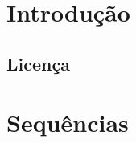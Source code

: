 \documentclass[tcc2]{uftex}
\begin{document}
\chapter{Introdução}
\label{sec:introducao}
\noindent 
\lipsum[1]

\lipsum[2]

\lipsum[3]

\section{Licença}
\label{sec:Licenca}

\noindent 
\lipsum[4]

\lipsum[5]

\lipsum[6]

\backmatter 
\singlespacing   


\appendix
\onehalfspacing

\chapter{Sequências}
\label{ape:sequencias}

\noindent 
\lipsum[7]
\end{document}
